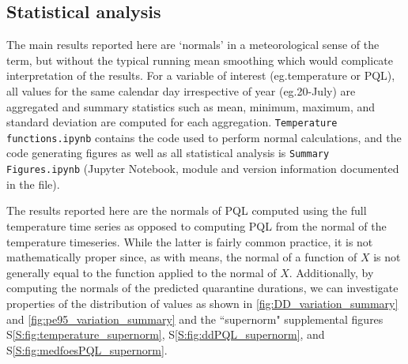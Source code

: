 \documentclass[10pt,a4paper,twocolumn]{article}
\begin{document}
\subsection*{Statistical analysis}

The main results reported here are `normals' in a meteorological sense of the term,
but without the typical running mean smoothing which would complicate
interpretation of the results.
For a variable of interest (eg.\@ temperature or PQL), 
all values for the same calendar day irrespective of year (eg.\@ 20-July) are
aggregated and summary statistics such as mean, minimum, maximum, and standard deviation 
are computed for each aggregation.
\texttt{Temperature functions.ipynb} contains the code used to perform normal calculations, 
and the code generating figures as well as all statistical analysis 
is \texttt{Summary Figures.ipynb}
(Jupyter Notebook\cite{PER-GRA:2007}, module and version information documented in the file).

The results reported here are the normals of PQL computed using the full temperature time series
as opposed to computing PQL from the normal of the temperature timeseries.
While the latter is fairly common practice, it is not mathematically proper 
since, as with means, the normal of a function of $X$ is not generally equal to the function applied to the normal of $X$.
Additionally, by computing the normals of the predicted quarantine durations, 
we can investigate properties of the distribution of values as shown in 
\autoref{fig:DD_variation_summary} and \autoref{fig:pe95_variation_summary} 
and the ``supernorm" supplemental figures 
S\ref{S:fig:temperature_supernorm}, 
S\ref{S:fig:ddPQL_supernorm},
and S\ref{S:fig:medfoesPQL_supernorm}.

%
%
\end{document}
